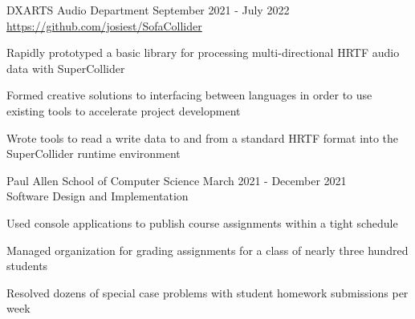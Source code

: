 \documentclass[10pt]{article}
\newenvironment{itemize*}
{\begin{itemize}[leftmargin=*]
    \setlength{\parskip}{0.5pt}}
{\end{itemize}}
\begin{document}
\begin{description}[leftmargin=!,
                    labelwidth=\widthof{\bfseries SuperCollider Audio
                                                  Programming Study}]
\item[SuperCollider Audio Programming Study]
    DXARTS Audio Department  \hfill September 2021 - July 2022\\
    \url{https://github.com/josiest/SofaCollider}
    
\end{description}
\begin{itemize*}
\item Rapidly prototyped a basic library for processing multi-directional HRTF audio data with SuperCollider
\item Formed creative solutions to interfacing between languages in order to
    use existing tools to accelerate project development
\item Wrote tools to read a write data to and from a standard HRTF format into
    the SuperCollider runtime environment
\end{itemize*}
\vspace{10pt}

\begin{description}[leftmargin=!,
                    labelwidth=\widthof{\bfseries Teaching Assistant}]

\item[Teaching Assistant] Paul Allen School of Computer Science \hfill 
    March 2021 - December 2021\\
    Software Design and Implementation
\end{description}
\begin{itemize*}
\item Used console applications to publish course assignments within a tight
      schedule
\item Managed organization for grading assignments for a class of nearly three
      hundred students
\item Resolved dozens of special case problems with student homework
      submissions per week
\end{itemize*}
\end{document}
